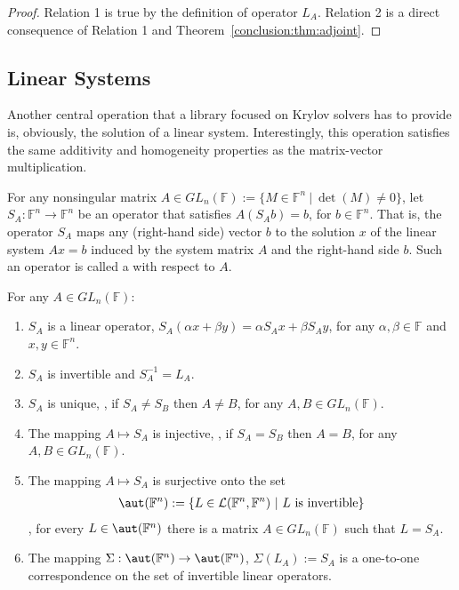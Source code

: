 \begin{proof}
Relation 1 is true by the definition of operator $L_A$. Relation 2 is a direct
consequence of Relation 1 and Theorem~\ref{conclusion:thm:adjoint}.
\end{proof}

\subsection{Linear Systems}
\label{conclusion:ssec:systems}

Another central operation that a library focused on Krylov solvers has to
provide is, obviously, the solution of a linear system. Interestingly, this
operation satisfies the same additivity and homogeneity properties as the
matrix-vector multiplication.

\begin{definition}
\label{conclusion:def:solver-linop}
For any nonsingular matrix $A \in GL_n(\mathbb{F}) := \lbrace M \in \mathbb{F}^n
\ \vert \ \det(M) \neq 0 \rbrace$, let $S_A : \mathbb{F}^n \rightarrow
\mathbb{F}^n$ be an operator that satisfies $A(S_Ab) = b$, for $b \in
\mathbb{F}^n$. That is, the operator $S_A$ maps any (right-hand side) vector $b$
to the solution $x$ of the linear system $Ax = b$ induced by the system matrix
$A$ and the right-hand side $b$. Such an operator is called a  with respect to $A$.
\end{definition}

\begin{theorem}
\label{conclusion:thm:solver-linop}
For any $A \in GL_n(\mathbb{F})$:
\begin{enumerate}
\item $S_A$ is a linear operator, \ie $S_A(\alpha x + \beta y) = \alpha S_A x +
\beta S_A y$, for any $\alpha,\beta \in \mathbb{F}$ and $x, y \in \mathbb{F}^n$.
\item $S_A$ is invertible and $S_A^{-1} = L_A^{}$.
\item $S_A$ is unique, \ie, if $S_A \neq S_B$ then $A \neq B$, for any $A, B
\in GL_n(\mathbb{F})$.
\item The mapping $A \mapsto S_A$ is injective, \ie, if $S_A = S_B$ then $A
= B$, for any $A, B \in GL_n(\mathbb{F})$.
\item The mapping $A \mapsto S_A$ is surjective onto the set
\begin{align}
\aut(\mathbb{F}^n) := \lbrace L \in \mathcal{L}(\mathbb{F}^n, \mathbb{F}^n) \
\vert \ L \text{ is invertible} \rbrace
\end{align}
\ie, for every $L \in \aut(\mathbb{F}^n)$ there is a matrix $A \in
GL_n(\mathbb{F})$ such that $L = S_A$.
\item The mapping $\Sigma : \aut(\mathbb{F}^n) \rightarrow \aut(\mathbb{F}^n)$,
$\Sigma(L_A) := S_A$ is a one-to-one correspondence on the set of invertible
linear operators.
\end{enumerate}
\end{theorem}


